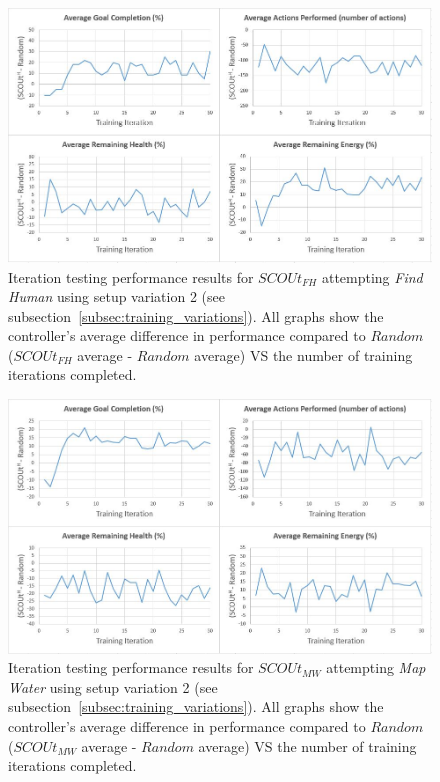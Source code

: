 \begin{appx}
\begin{figure}[H]
  \includegraphics[width=0.9\columnwidth]{Figures/Results/TrainingVariation2/FindHuman.JPG}
  \caption{Iteration testing performance results for $SCOUt_{FH}$ attempting \textit{Find Human} using setup variation 2 (see subsection~\ref{subsec:training_variations}). All graphs show the controller's average difference in performance compared to $Random$ ($SCOUt_{FH}$ average - $Random$ average) VS the number of training iterations completed.}
  \label{appendix:findhuman_training_variation2}
\end{figure}
\end{appx}


\begin{appx}
\begin{figure}[H]
  \includegraphics[width=0.9\columnwidth]{Figures/Results/TrainingVariation2/MapWater.JPG}
  \caption{Iteration testing performance results for $SCOUt_{MW}$ attempting \textit{Map Water} using setup variation 2 (see subsection~\ref{subsec:training_variations}). All graphs show the controller's average difference in performance compared to $Random$ ($SCOUt_{MW}$ average - $Random$ average) VS the number of training iterations completed.}
  \label{appendix:mapwater_training_variation2}
\end{figure}
\end{appx}


